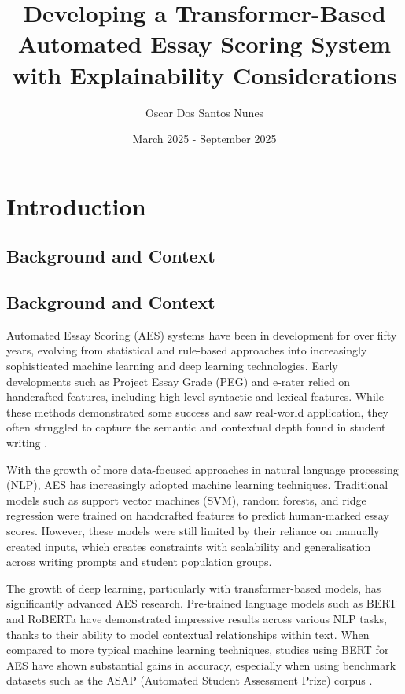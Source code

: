 \documentclass[12pt]{report}
\begin{document}
\title{Developing a Transformer-Based Automated Essay Scoring System with Explainability Considerations}
\author{Oscar Dos Santos Nunes}
\date{March 2025 - September 2025}
\maketitle

\tableofcontents
\newpage

\chapter{Introduction}

\section{Background and Context}

\section{Background and Context}

Automated Essay Scoring (AES) systems have been in development for over fifty years, evolving from statistical and rule-based approaches into increasingly sophisticated machine learning and deep 
learning technologies. Early developments such as Project Essay Grade (PEG) \parencite{page1966imminence} and e-rater \parencite{attali2006e_rater} relied on handcrafted features, including high-level 
syntactic and lexical features. While these methods demonstrated some success and saw real-world application, they often struggled to capture the semantic and contextual depth found in student writing 
\parencite{shermis2013handbook}.

With the growth of more data-focused approaches in natural language processing (NLP), AES has increasingly adopted machine learning techniques. Traditional models such as support vector machines (SVM), 
random forests, and ridge regression were trained on handcrafted features to predict human-marked essay scores. However, these models were still limited by their reliance on manually created inputs, 
which creates constraints with scalability and generalisation across writing prompts and student population groups.

The growth of deep learning, particularly with transformer-based models, has significantly advanced AES research. Pre-trained language models such as BERT \parencite{devlin2019bert} and RoBERTa 
\parencite{liu2019roberta} have demonstrated impressive results across various NLP tasks, thanks to their ability to model contextual relationships within text. When compared to more typical 
machine learning techniques, studies using BERT for AES have shown substantial gains in accuracy, especially when using benchmark datasets such as the ASAP (Automated Student Assessment Prize) 
corpus \parencite{taghipour2016neural}.
\end{document}
